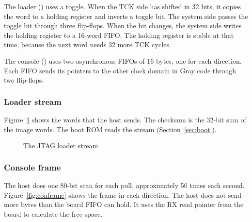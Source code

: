The loader () uses a toggle. When the TCK side has shifted in 32 bits, it copies the word to a holding register and inverts a toggle bit. The system side passes the toggle bit through three flip-flops. When the bit changes, the system side writes the holding register to a 16-word FIFO. The holding register is stable at that time, because the next word needs 32 more TCK cycles.

The console () uses two asynchronous FIFOs of 16 bytes, one for each direction. Each FIFO sends its pointers to the other clock domain in Gray code through two flip-flops.

\subsubsection{Loader stream}
Figure~\ref{fig:jtagstream} shows the words that the host sends. The checksum is the 32-bit sum of the image words. The boot ROM reads the stream (Section~\ref{sec:boot}).

\begin{figure}[H]
  \centering
  \caption{The JTAG loader stream}
  \label{fig:jtagstream}
\end{figure}

\subsubsection{Console frame}
The host does one 80-bit scan for each poll, approximately 50 times each second. Figure~\ref{fig:conframe} shows the frame in each direction. The host does not send more bytes than the board FIFO can hold. It uses the RX read pointer from the board to calculate the free space.

